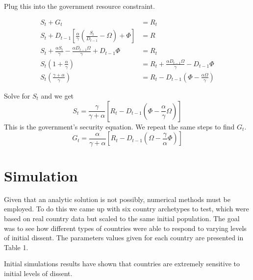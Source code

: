 \documentclass[12pt]{article}
\begin{document}
\begin{spacing}{1.5}
\noindent Plug this into the government resource constraint. 


\begin{equation}
    \begin{aligned}
        S_t+G_t&=R_t \\
        S_t+  D_{t-1}\left[\frac{\alpha}{\gamma } \left(\frac{S_t}{ D_{t-1}} -\Omega \right) +\Phi \right]  &= R \\
S_t+ \frac{\alpha S_t}{\gamma } -\frac{\alpha  D_{t-1} \Omega}{\gamma } +D_{t-1}\Phi &=R_t \\
S_t\left(1+\frac{\alpha}{\gamma }\right) &= R_t+ \frac{\alpha D_{t-1} \Omega}{\gamma } - D_{t-1}\Phi \\
S_t\left(\frac{\gamma  + \alpha}{\gamma }\right) &= R_t - D_{t-1} \left(\Phi - \frac{\alpha  \Omega}{\gamma } \right) 
    \end{aligned}
\end{equation}


\noindent Solve for $S_t$ and we get
\begin{equation}
S_t=\frac{\gamma }{\gamma  +\alpha} \left[ R_t - D_{t-1} \left(\Phi - \frac{\alpha}{\gamma }\Omega \right) \right]
\end{equation}
\noindent This is the government's security equation. We repeat the same steps to find $G_t$. 
\begin{equation}
G_t=\frac{\alpha}{\gamma  +\alpha} \left[ R_t - D_{t-1} \left(\Omega - \frac{\gamma }{\alpha}\Phi \right) \right]
\end{equation}

\section{Simulation} 

Given that an analytic solution is not possibly, numerical methods must be employed. To do this we came up with six country archetypes to test, which were based on real country data but scaled to the same initial population. The goal was to see how different types of countries were able to respond to varying levels of initial dissent. The parameters values given for each country are presented in Table 1. 

\begin{figure}[htb]
\end{figure}

Initial simulations results have shown that countries are extremely sensitive to initial levels of dissent.


\end{spacing}
\end{document}
